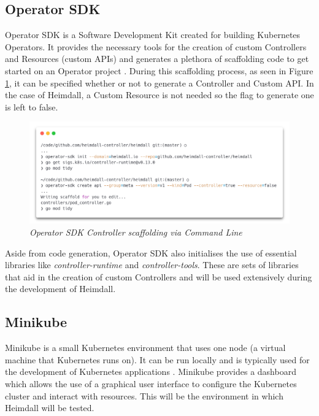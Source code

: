 \documentclass{article}
\begin{document}
\subsection{Operator SDK} \label{osdk}

Operator SDK is a Software Development Kit created for building Kubernetes Operators. It provides the necessary tools for the creation of custom Controllers and Resources (custom APIs) and generates a plethora of scaffolding code to get started on an Operator project \cite{osdk-overview}. During this scaffolding process, as seen in Figure \ref{osdk-img}, it can be specified whether or not to generate a Controller and Custom API. In the case of Heimdall, a Custom Resource is not needed so the flag to generate one is left to false.

\begin{figure}[H]
    \centering
    \includegraphics[width=160mm]{tools/osdk.png}
    \caption{\emph{Operator SDK Controller scaffolding via Command Line}}
    \label{osdk-img}
\end{figure}

Aside from code generation, Operator SDK also initialises the use of essential libraries like \emph{controller-runtime} and \emph{controller-tools}. These are sets of libraries that aid in the creation of custom Controllers and will be used extensively during the development of Heimdall.


\subsection{Minikube}

Minikube is a small Kubernetes environment that uses one node (a virtual machine that Kubernetes runs on). It can be run locally and is typically used for the development of Kubernetes applications \cite{minikube-docs}. Minikube provides a dashboard which allows the use of a graphical user interface to configure the Kubernetes cluster and interact with resources. This will be the environment in which Heimdall will be tested. 
\end{document}
